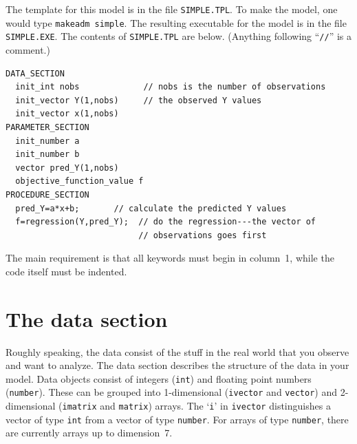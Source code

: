\documentclass{admbmanual}
\begin{document}
The template for this model is in the file \texttt{SIMPLE.TPL}. To
make the model, one would type \texttt{makeadm simple}. The resulting 
executable for the model is in the file \texttt{SIMPLE.EXE}.
The contents of \texttt{SIMPLE.TPL} are below.  (Anything following ``\texttt{//}'' is a comment.)
\begin{lstlisting}
DATA_SECTION
  init_int nobs             // nobs is the number of observations
  init_vector Y(1,nobs)     // the observed Y values
  init_vector x(1,nobs)
PARAMETER_SECTION
  init_number a   
  init_number b   
  vector pred_Y(1,nobs)
  objective_function_value f
PROCEDURE_SECTION
  pred_Y=a*x+b;       // calculate the predicted Y values
  f=regression(Y,pred_Y);  // do the regression---the vector of 
                           // observations goes first
\end{lstlisting}
The main requirement is that all keywords must begin in column~1,
while the code itself must be indented.  


\section{The data section}

Roughly speaking, the data consist of the stuff in the real
world that you observe and want to analyze. The data section
describes the structure of the data in your model. Data objects 
consist of integers (\texttt{int}) and floating point numbers (\texttt{number}). 
These can be grouped into 1-dimensional (\texttt{ivector} and \texttt{vector}) 
and 2-dimensional (\texttt{imatrix} and \texttt{matrix}) arrays.
The `\texttt{i}' in \texttt{ivector} distinguishes a vector of
type \texttt{int} from a vector of type \texttt{number}.
For arrays of type \texttt{number}, there are currently arrays up to dimension~7.
\end{document}
